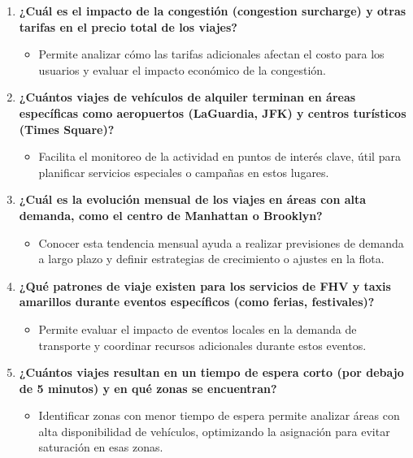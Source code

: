 \documentclass{article}
\begin{document}
\begin{enumerate}[label=\arabic*.]
    \item \textbf{¿Cuál es el impacto de la congestión (congestion surcharge) y otras tarifas en el precio total de los viajes?}
    \begin{itemize}
        \item Permite analizar cómo las tarifas adicionales afectan el costo para los usuarios y evaluar el impacto económico de la congestión.
    \end{itemize}
    
    \item \textbf{¿Cuántos viajes de vehículos de alquiler terminan en áreas específicas como aeropuertos (LaGuardia, JFK) y centros turísticos (Times Square)?}
    \begin{itemize}
        \item Facilita el monitoreo de la actividad en puntos de interés clave, útil para planificar servicios especiales o campañas en estos lugares.
    \end{itemize}
    
    \item \textbf{¿Cuál es la evolución mensual de los viajes en áreas con alta demanda, como el centro de Manhattan o Brooklyn?}
    \begin{itemize}
        \item Conocer esta tendencia mensual ayuda a realizar previsiones de demanda a largo plazo y definir estrategias de crecimiento o ajustes en la flota.
    \end{itemize}
    
    \item \textbf{¿Qué patrones de viaje existen para los servicios de FHV y taxis amarillos durante eventos específicos (como ferias, festivales)?}
    \begin{itemize}
        \item Permite evaluar el impacto de eventos locales en la demanda de transporte y coordinar recursos adicionales durante estos eventos.
    \end{itemize}
    
    \item \textbf{¿Cuántos viajes resultan en un tiempo de espera corto (por debajo de 5 minutos) y en qué zonas se encuentran?}
    \begin{itemize}
        \item Identificar zonas con menor tiempo de espera permite analizar áreas con alta disponibilidad de vehículos, optimizando la asignación para evitar saturación en esas zonas.
    \end{itemize}
\end{enumerate}
\end{document}
